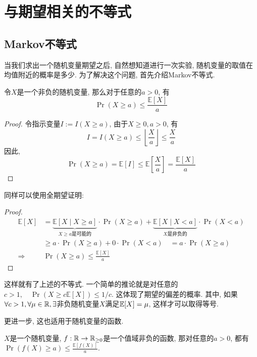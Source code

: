 \documentclass{ctexart}
\begin{document}
\section{与期望相关的不等式}

\subsection{Markov不等式}

当我们求出一个随机变量期望之后, 自然想知道进行一次实验, 随机变量的取值在均值附近的概率是多少. 为了解决这个问题, 首先介绍Markov不等式. 


\begin{theorem}[Markov不等式]
    令$X$是一个非负的随机变量, 那么对于任意的$a>0$, 有
$$
\operatorname{Pr}(X \geq a) \leq \frac{\mathbb{E}[X]}{a}
$$

\end{theorem}

\begin{proof}
    令指示变量$I:=I(X\geq a)$, 由于$X\geq 0, a>0$, 有
    $$
I=I(X \geq a) \leq\left\lfloor\frac{X}{a}\right\rfloor \leq \frac{X}{a}
$$
因此, 
$$
\operatorname{Pr}(X \geq a)=\mathbb{E}[I] \leq \mathbb{E}\left[\frac{X}{a}\right]=\frac{\mathbb{E}[X]}{a}
$$
\end{proof}

同样可以使用全期望证明: 
\begin{proof}
    $$
    \begin{aligned}\mathbb{E}[X] & =\underbrace{\mathbb{E}[X\mid X\geq a]}_{X\geq a\text{是可能的}}\cdot\operatorname{Pr}(X\geq a)+\underbrace{\mathbb{E}[X\mid X<a]}_{X\text{是非负的}}\cdot\operatorname{Pr}(X<a)\\
 & \geq a\cdot\operatorname{Pr}(X\geq a)+0\cdot\operatorname{Pr}(X<a)\quad=a\cdot\operatorname{Pr}(X\geq a)\\
\Longrightarrow & \operatorname{Pr}(X\geq a)\leq\frac{\mathbb{E}[X]}{a}
\end{aligned}
$$
\end{proof}

这样就有了上述的不等式. 一个简单的推论就是对任意的$c>1, \quad \operatorname{Pr}(X \geq c \mathbb{E}[X]) \leq 1 / c$. 这体现了期望的偏差的概率. 其中, 如果$\forall c>1, \forall \mu \in \mathbb R, \exists$非负随机变量$X$满足$\mathbb E[X]=\mu$, 这样才可以取得等号. 

更进一步, 这也适用于随机变量的函数. 

\begin{corollary}
    $X$是一个随机变量, $f:\mathbb R\to \mathbb R_{\geq 0}$是一个值域非负的函数, 那对任意的$a>0$, 都有$\operatorname{Pr}(f(X) \geq a) \leq \frac{\mathbb{E}[f(X)]}{a}$. 
\end{corollary}
\end{document}
